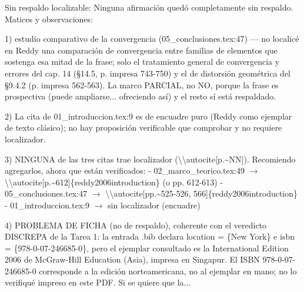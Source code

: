 \documentclass[11pt,a4paper]{article}
\newcommand{\campo}[1]{\textcolor{gris}{\footnotesize #1}}
\begin{document}
{\small\campo{Sin respaldo localizable:} Ninguna afirmación quedó completamente sin respaldo. Matices y observaciones:

1) \textquotedbl{}estudio comparativo de la convergencia\textquotedbl{} (05\_conclusiones.tex:47) --- no localicé en Reddy una comparación de convergencia entre familias de elementos que sostenga esa mitad de la frase; solo el tratamiento general de convergencia y errores del cap. 14 (§14.5, p. impresa 743-750) y el de distorsión geométrica del §9.4.2 (p. impresa 562-563). La marco PARCIAL, no NO, porque la frase es prospectiva (\textquotedbl{}puede ampliarse... ofreciendo así\textquotedbl{}) y el resto sí está respaldado.

2) La cita de 01\_introduccion.tex:9 es de encuadre puro (Reddy como ejemplar de \textquotedbl{}texto clásico\textquotedbl{}); no hay proposición verificable que comprobar y no requiere localizador.

3) NINGUNA de las tres citas trae localizador (\textbackslash{}\textbackslash{}autocite[p.\textasciitilde{}NN]). Recomiendo agregarlos, ahora que están verificados:
   - 02\_marco\_teorico.tex:49 $\rightarrow$ \textbackslash{}\textbackslash{}autocite[p.\textasciitilde{}612]\{reddy2006introduction\} (o pp. 612-613)
   - 05\_conclusiones.tex:47 $\rightarrow$ \textbackslash{}\textbackslash{}autocite[pp.\textasciitilde{}525-526, 566]\{reddy2006introduction\}
   - 01\_introduccion.tex:9 $\rightarrow$ sin localizador (encuadre)

4) PROBLEMA DE FICHA (no de respaldo), coherente con el veredicto DISCREPA de la Tarea 1: la entrada .bib declara location = \{New York\} e isbn = \{978-0-07-246685-0\}, pero el ejemplar consultado es la \textquotedbl{}International Edition 2006\textquotedbl{} de McGraw-Hill Education (Asia), impresa en Singapur. El ISBN 978-0-07-246685-0 corresponde a la edición norteamericana, no al ejemplar en mano; no lo verifiqué impreso en este PDF. Si se quiere que la...\par}
\end{document}
